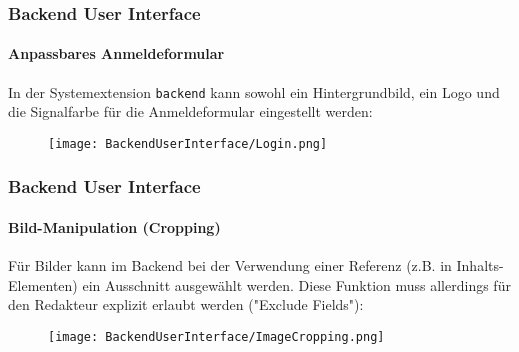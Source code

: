 %
\begin{frame}[fragile]
	\frametitle{Backend User Interface}
	\framesubtitle{Anpassbares Anmeldeformular}

	In der Systemextension \texttt{backend} kann sowohl ein Hintergrundbild,
	ein Logo und die Signalfarbe für die Anmeldeformular eingestellt werden:

	\begin{figure}
		\texttt{[image: BackendUserInterface/Login.png]}
	\end{figure}

\end{frame}

\begin{frame}[fragile]
	\frametitle{Backend User Interface}
	\framesubtitle{Bild-Manipulation (Cropping)}

	Für Bilder kann im Backend bei der Verwendung einer Referenz (z.B. in
	Inhalts-Elementen) ein Ausschnitt ausgewählt werden. Diese Funktion muss
	allerdings für den Redakteur explizit erlaubt werden ("Exclude Fields"):

	\begin{figure}
		\texttt{[image: BackendUserInterface/ImageCropping.png]}
	\end{figure}

\end{frame}

